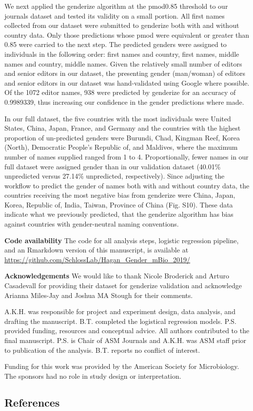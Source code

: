 \documentclass[11pt,]{article}
\begin{document}
We next applied the genderize algorithm at the pmod0.85 threshold to our
journals dataset and tested its validity on a small portion. All first
names collected from our dataset were submitted to genderize both with
and without country data. Only those predictions whose pmod were
equivalent or greater than 0.85 were carried to the next step. The
predicted genders were assigned to individuals in the following order:
first names and country, first names, middle names and country, middle
names. Given the relatively small number of editors and senior editors
in our dataset, the presenting gender (man/woman) of editors and senior
editors in our dataset was hand-validated using Google where possible.
Of the 1072 editor names, 938 were predicted by genderize for an
accuracy of 0.9989339, thus increasing our confidence in the gender
predictions where made.

In our full dataset, the five countries with the most individuals were
United States, China, Japan, France, and Germany and the countries with
the highest proportion of un-predicted genders were Burundi, Chad,
Kingman Reef, Korea (North), Democratic People's Republic of, and
Maldives, where the maximum number of names supplied ranged from 1 to 4.
Proportionally, fewer names in our full dataset were assigned gender
than in our validation dataset (40.01\% unpredicted versus 27.14\%
unpredicted, respectively). Since adjusting the workflow to predict the
gender of names both with and without country data, the countries
receiving the most negative bias from genderize were China, Japan,
Korea, Republic of, India, Taiwan, Province of China (Fig. S10). These
data indicate what we previously predicted, that the genderize algorithm
has bias against countries with gender-neutral naming conventions.

\textbf{Code availability} The code for all analysis steps, logistic
regression pipeline, and an Rmarkdown version of this manuscript, is
available at \url{https://github.com/SchlossLab/Hagan_Gender_mBio_2019/}

\textbf{Acknowledgements} We would like to thank Nicole Broderick and
Arturo Casadevall for providing their dataset for genderize validation
and acknowledge Arianna Miles-Jay and Joshua MA Stough for their
comments.

A.K.H. was responsible for project and experiment design, data analysis,
and drafting the manuscript. B.T. completed the logistical regression
models. P.S. provided funding, resources and conceptual advice. All
authors contributed to the final manuscript. P.S. is Chair of ASM
Journals and A.K.H. was ASM staff prior to publication of the analysis.
B.T. reports no conflict of interest.

Funding for this work was provided by the American Society for
Microbiology. The sponsors had no role in study design or
interpretation.

\subsection{References}\label{references}
\end{document}
